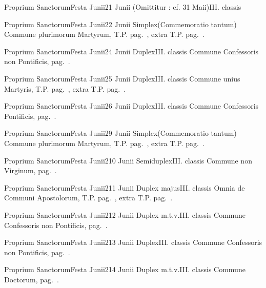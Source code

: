 \documentclass[nocturnale-romanum.tex]{subfiles}
\begin{document}

	{Proprium Sanctorum}{Festa Junii}{2}{1 Junii}
	{(Omittitur : cf. 31 Maii)}{III. classis}
	{}
	{}

	{Proprium Sanctorum}{Festa Junii}{2}{2 Junii}
	{Simplex}{(Commemoratio tantum)}
	{Commune plurimorum Martyrum, T.P. pag.\ \pageref{M-MRTP}, extra T.P. pag.\ \pageref{M-PMEX}.}
	{}

	{Proprium Sanctorum}{Festa Junii}{2}{4 Junii}
	{Duplex}{III. classis}
	{Commune Confessoris non Pontificis, pag.\ \pageref{M-CONP}.}
	{}

	{Proprium Sanctorum}{Festa Junii}{2}{5 Junii}
	{Duplex}{III. classis}
	{Commune unius Martyris, T.P. pag.\ \pageref{M-MRTP}, extra T.P. pag.\ \pageref{M-UMEX}.}
	{}

	{Proprium Sanctorum}{Festa Junii}{2}{6 Junii}
	{Duplex}{III. classis}
	{Commune Confessoris Pontificis, pag.\ \pageref{M-COPO}.}
	{}

	{Proprium Sanctorum}{Festa Junii}{2}{9 Junii}
	{Simplex}{(Commemoratio tantum)}
	{Commune plurimorum Martyrum, T.P. pag.\ \pageref{M-MRTP}, extra T.P. pag.\ \pageref{M-PMEX}.}
	{}

	{Proprium Sanctorum}{Festa Junii}{2}{10 Junii}
	{Semiduplex}{III. classis}
	{Commune non Virginum, pag.\ \pageref{M-MU}.}
	{}

	{Proprium Sanctorum}{Festa Junii}{2}{11 Junii}
	{Duplex majus}{III. classis}
	{Omnia de Communi Apostolorum, T.P. pag.\ \pageref{M-APTP}, extra T.P. pag.\ \pageref{M-APEX}.}
	{}

	{Proprium Sanctorum}{Festa Junii}{2}{12 Junii}
	{Duplex m.t.v.}{III. classis}
	{Commune Confessoris non Pontificis, pag.\ \pageref{M-CONP}.}
	{}

	{Proprium Sanctorum}{Festa Junii}{2}{13 Junii}
	{Duplex}{III. classis}
	{Commune Confessoris non Pontificis, pag.\ \pageref{M-CONP}.}
	{}

	{Proprium Sanctorum}{Festa Junii}{2}{14 Junii}
	{Duplex m.t.v.}{III. classis}
	{Commune Doctorum, pag.\ \pageref{M-CODO}.}
	{}
\end{document}
